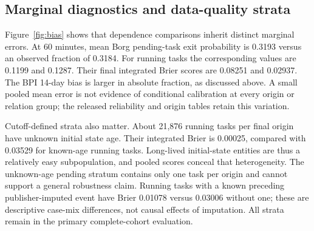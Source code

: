 \subsection{Marginal diagnostics and data-quality strata}
Figure~\ref{fig:bias} shows that dependence comparisons inherit distinct
marginal errors. At 60 minutes, mean Borg pending-task exit probability is
0.3193 versus an observed fraction of 0.3184. For running tasks the corresponding
values are 0.1199 and 0.1287. Their final integrated Brier scores are 0.08251
and 0.02937. The BPI 14-day bias is larger in absolute fraction, as discussed
above. A small pooled mean error is not evidence of conditional calibration at
every origin or relation group; the released reliability and origin tables
retain this variation.

Cutoff-defined strata also matter. About 21,876 running tasks per final origin
have unknown initial state age. Their integrated Brier is 0.00025, compared
with 0.03529 for known-age running tasks. Long-lived initial-state entities are
thus a relatively easy subpopulation, and pooled scores conceal that
heterogeneity. The unknown-age pending stratum contains only one task per
origin and cannot support a general robustness claim. Running tasks with a
known preceding publisher-imputed event have Brier 0.01078 versus 0.03006
without one; these are descriptive case-mix differences, not causal effects
of imputation. All strata remain in the primary complete-cohort evaluation.


